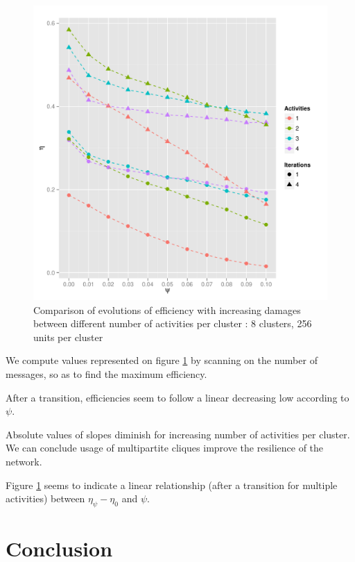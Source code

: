 \documentclass[english,10pt,twocolumn]{IEEEtran}
\theoremstyle{definition}
\begin{document}
	\begin{figure}[!htb]
		
		\includegraphics[scale=0.50]{Courbes/5portant_psi_c8l256e4}
		\caption{Comparison of evolutions of efficiency with increasing damages between different number of activities per cluster :  8 clusters, 256 units per cluster%
		\label{comppsi}}
	\end{figure}

	We compute values represented on figure \ref{comppsi} by scanning on the number of messages, so as to find the maximum efficiency.	
	
	After a transition, efficiencies seem to follow a linear decreasing low according to $\psi$.
	
	Absolute values of slopes diminish for increasing number of activities per cluster. We can conclude usage of multipartite cliques improve the resilience of the network.
	
	
	
	
	Figure \ref{comppsi} seems to indicate a linear relationship (after a transition for multiple activities) between $\eta_\psi -\eta_0$ and $\psi$.
	
	
	\section{Conclusion}	
	
	
	
	
	
	
	\nocite{*}
     {}
\end{document}
